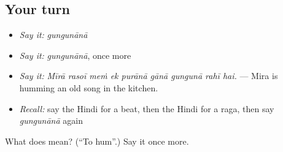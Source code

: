 \subsection*{Your turn}
\begin{itemize}
\raggedright
  \item \emph{Say it:} \emph{gungunānā}
  \item \emph{Say it:} \emph{gungunānā}, once more
  \item \emph{Say it:} \emph{Mīrā rasoī meṁ ek purānā gānā gungunā rahī hai.} — Mira is humming an old song in the kitchen.
  \item \emph{Recall:} say the Hindi for a beat, then the Hindi for a raga, then say \emph{gungunānā} again
\end{itemize}

\begin{tcolorbox}[breakable,colback=teal!4,colframe=teal!35!black,title={Before you move on}]
What does  mean? (\textquotedblleft{}To hum\textquotedblright{}.) Say it once more.
\end{tcolorbox}
